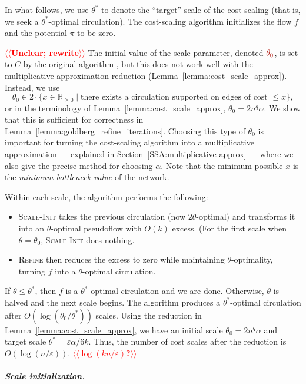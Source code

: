 \documentclass[a4paper,UKenglish]{socg-lipics-v2018}
\makeatletter
\def\eps{\varepsilon}
\def\reals{\mathbb{R}}
\theoremstyle{plain}
\numberwithin{figure}{section}
\renewcommand{\paragraph}{\subparagraph}
\def\EMPH#1{\textcolor{BrickRed}{{\emph{#1}}}}
\def\n@te#1{\textsf{\boldmath \textbf{$\langle\!\langle$#1$\rangle\!\rangle$}}\leavevmode}
\def\note#1{\textcolor{red}{\n@te{#1}}}
\makeatother
\begin{document}
In what follows, we use \EMPH{$\theta^*$} to denote the ``target'' scale of the
cost-scaling (that is, we seek a $\theta^*$-optimal circulation).
The cost-scaling algorithm initializes the flow $f$ and the potential $\pi$ to be zero.

\note{Unclear; rewrite}
The initial value of the scale parameter, denoted $\EMPH{$\theta_0$}$,
is set to $C$ by the original algorithm \cite{GHKT17}, but this does not work
well with the multiplicative approximation reduction (Lemma~\ref{lemma:cost_scale_approx}).
Instead, we use
\[
\theta_0 \in 2 \cdot \{x \in \reals_{\geq 0} \mid \text{there exists a circulation supported on edges of cost $\leq x$}\},
\]
or in the terminology of Lemma~\ref{lemma:cost_scale_approx}, $\theta_0 = 2n^q \alpha$.
We show that this is sufficient for correctness in Lemma~\ref{lemma:goldberg_refine_iterations}.
Choosing this type of $\theta_0$ is important for turning the cost-scaling
algorithm into a multiplicative approximation --- explained in
Section~\ref{SSA:multiplicative-approx} --- where we also give the precise
method for choosing $\alpha$.
Note that the minimum possible $x$ is the \emph{minimum bottleneck value} of the network.

Within each scale, the algorithm performs the following:
\begin{itemize}
\item
\textsc{Scale-Init} takes the previous
circulation (now $2\theta$-optimal) and transforms it into an
$\theta$-optimal pseudoflow with $O(k)$ excess.
(For the first scale when $\theta = \theta_0$, \textsc{Scale-Init} does nothing.
\item
\textsc{Refine} then reduces the excess to zero while maintaining $\theta$-optimality, turning $f$ into a $\theta$-optimal circulation.
\end{itemize}
If $\theta \leq \theta^*$, then $f$ is a $\theta^*$-optimal circulation and we are done.
Otherwise, $\theta$ is halved and the next scale begins.
The algorithm produces a $\theta^*$-optimal circulation after
$O(\log(\theta_0/\theta^*))$ scales.
%
Using the reduction in Lemma~\ref{lemma:cost_scale_approx}, we have an initial
scale $\theta_0 = 2n^q\alpha$ and target scale $\theta^* = \eps\alpha/6k$.
Thus, the number of cost scales after the reduction is $O(\log(n/\eps))$. \note{$\log(kn/\eps)$?}

\paragraph{Scale initialization.}
\end{document}
